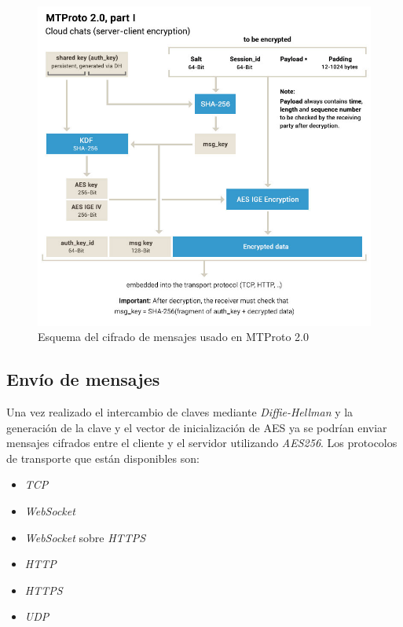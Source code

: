 \newpage
\begin{figure}[htb]
	\centering
	\includegraphics[scale=0.4]{imagenes/diagramaMTProto.jpg} 
	\caption{Esquema del cifrado de mensajes usado en MTProto 2.0 \cite{WebProto}}
	\label{mtproto2}
\end{figure}

\subsection{Envío de mensajes}
Una vez realizado el intercambio de claves mediante \emph{Diffie-Hellman} y la generación de la clave y el vector de inicialización de AES ya se podrían enviar mensajes cifrados entre el cliente y el servidor utilizando \emph{AES256}.
Los protocolos de transporte que están disponibles son:
\begin{itemize}
	\item \emph{TCP}
	\item \emph{WebSocket}
	\item \emph{WebSocket} sobre \emph{HTTPS}
	\item \emph{HTTP}
	\item \emph{HTTPS}
	\item \emph{UDP}
\end{itemize}

